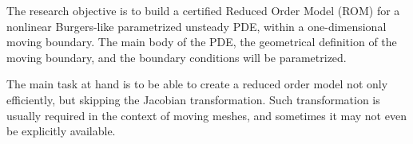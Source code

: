 



The research objective is to build a certified Reduced Order Model (ROM) 
for a nonlinear Burgers-like parametrized unsteady PDE, 
within a one-dimensional moving boundary.
The main body of the PDE, 
the geometrical definition of the moving boundary,
and the boundary conditions will be parametrized.

The main task at hand is to be able to create a reduced order model 
not only efficiently,
but skipping the Jacobian transformation.
Such transformation is usually required in the context of moving meshes,
and sometimes it may not even be explicitly available.

